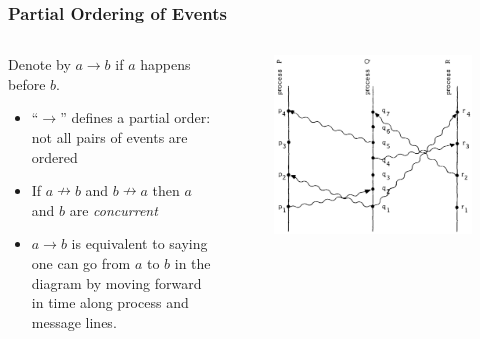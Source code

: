 \documentclass{beamer}
\begin{document}
\frame
{
  \frametitle{Partial Ordering of Events}
	\begin{columns}
	\begin{column}{0.6\textwidth}

		Denote by $a\to b$ if $a$ happens before $b$.

		\begin{itemize}
			\item<2-> ``$\to$'' defines a partial order: not all pairs of events are ordered
			\item<3-> If $a\nrightarrow b$ and $b\nrightarrow a$ then $a$ and $b$ are \emph{concurrent}
			\item<4-> $a\to b$ is equivalent to saying one can go from $a$ to $b$ in the diagram by moving forward in time along process and message lines.
		\end{itemize}


	\end{column}
	\begin{column}{0.4\textwidth}

		\begin{figure}[ht!]
		\includegraphics[width=\textwidth]{files/events-messages.png}
		\end{figure}


	\end{column}
	\end{columns}

}
\end{document}
